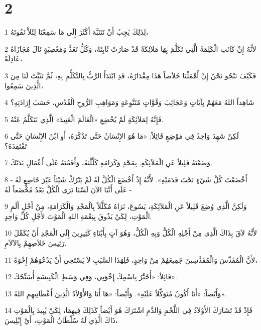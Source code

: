 \chapter{2}

\par 1 لِذَلِكَ يَجِبُ أَنْ نَتَنَبَّهَ أَكْثَرَ إِلَى مَا سَمِعْنَا لِئَلاَّ نَفُوتَهُ،
\par 2 لأَنَّهُ إِنْ كَانَتِ الْكَلِمَةُ الَّتِي تَكَلَّمَ بِهَا مَلاَئِكَةٌ قَدْ صَارَتْ ثَابِتَةً، وَكُلُّ تَعَدٍّ وَمَعْصِيَةٍ نَالَ مُجَازَاةً عَادِلَةً،
\par 3 فَكَيْفَ نَنْجُو نَحْنُ إِنْ أَهْمَلْنَا خَلاَصاً هَذَا مِقْدَارُهُ، قَدِ ابْتَدَأَ الرَّبُّ بِالتَّكَلُّمِ بِهِ، ثُمَّ تَثَبَّتَ لَنَا مِنَ الَّذِينَ سَمِعُوا،
\par 4 شَاهِداً اللهُ مَعَهُمْ بِآيَاتٍ وَعَجَائِبَ وَقُوَّاتٍ مُتَنَّوِعَةٍ وَمَوَاهِبِ الرُّوحِ الْقُدُسِ، حَسَبَ إِرَادَتِهِ؟
\par 5 فَإِنَّهُ لِمَلاَئِكَةٍ لَمْ يُخْضِعِ «الْعَالَمَ الْعَتِيدَ» الَّذِي نَتَكَلَّمُ عَنْهُ.
\par 6 لَكِنْ شَهِدَ وَاحِدٌ فِي مَوْضِعٍ قَائِلاً: «مَا هُوَ الإِنْسَانُ حَتَّى تَذْكُرَهُ، أَوِ ابْنُ الإِنْسَانِ حَتَّى تَفْتَقِدَهُ؟
\par 7 وَضَعْتَهُ قَلِيلاً عَنِ الْمَلاَئِكَةِ. بِمَجْدٍ وَكَرَامَةٍ كَلَّلْتَهُ، وَأَقَمْتَهُ عَلَى أَعْمَالِ يَدَيْكَ.
\par 8 أَخْضَعْتَ كُلَّ شَيْءٍ تَحْتَ قَدَمَيْهِ». لأَنَّهُ إِذْ أَخْضَعَ الْكُلَّ لَهُ لَمْ يَتْرُكْ شَيْئاً غَيْرَ خَاضِعٍ لَهُ - عَلَى أَنَّنَا الآنَ لَسْنَا نَرَى الْكُلَّ بَعْدُ مُخْضَعاً لَهُ -
\par 9 وَلَكِنَّ الَّذِي وُضِعَ قَلِيلاً عَنِ الْمَلاَئِكَةِ، يَسُوعَ، نَرَاهُ مُكَلَّلاً بِالْمَجْدِ وَالْكَرَامَةِ، مِنْ أَجْلِ أَلَمِ الْمَوْتِ، لِكَيْ يَذُوقَ بِنِعْمَةِ اللهِ الْمَوْتَ لأَجْلِ كُلِّ وَاحِدٍ.
\par 10 لأَنَّهُ لاَقَ بِذَاكَ الَّذِي مِنْ أَجْلِهِ الْكُلُّ وَبِهِ الْكُلُّ، وَهُوَ آتٍ بِأَبْنَاءٍ كَثِيرِينَ إِلَى الْمَجْدِ أَنْ يُكَمِّلَ رَئِيسَ خَلاَصِهِمْ بِالآلاَمِ.
\par 11 لأَنَّ الْمُقَدِّسَ وَالْمُقَدَّسِينَ جَمِيعَهُمْ مِنْ وَاحِدٍ، فَلِهَذَا السَّبَبِ لاَ يَسْتَحِي أَنْ يَدْعُوَهُمْ إِخْوَةً،
\par 12 قَائِلاً: «أُخَبِّرُ بِاسْمِكَ إِخْوَتِي، وَفِي وَسَطِ الْكَنِيسَةِ أُسَبِّحُكَ».
\par 13 وَأَيْضاً: «أَنَا أَكُونُ مُتَوَكِّلاً عَلَيْهِ». وَأَيْضاً: «هَا أَنَا وَالأَوْلاَدُ الَّذِينَ أَعْطَانِيهِمِ اللهُ».
\par 14 فَإِذْ قَدْ تَشَارَكَ الأَوْلاَدُ فِي اللَّحْمِ وَالدَّمِ اشْتَرَكَ هُوَ أَيْضاً كَذَلِكَ فِيهِمَا، لِكَيْ يُبِيدَ بِالْمَوْتِ ذَاكَ الَّذِي لَهُ سُلْطَانُ الْمَوْتِ، أَيْ إِبْلِيسَ،
